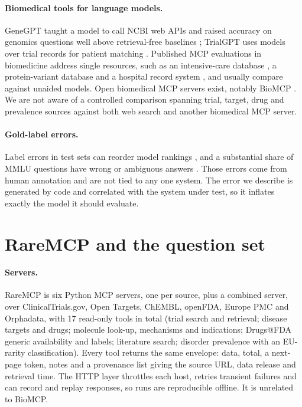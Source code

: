 \documentclass[11pt]{article}
\begin{document}
\paragraph{Biomedical tools for language models.} GeneGPT taught a model to call NCBI web APIs and raised accuracy on genomics questions well above retrieval-free baselines \citep{genegpt}; TrialGPT uses models over trial records for patient matching \citep{trialgpt}. Published MCP evaluations in biomedicine address single resources, such as an intensive-care database \citep{m3}, a protein-variant database \citep{disphasedb} and a hospital record system \citep{ehrmcp}, and usually compare against unaided models. Open biomedical MCP servers exist, notably BioMCP \citep{biomcp}. We are not aware of a controlled comparison spanning trial, target, drug and prevalence sources against both web search and another biomedical MCP server.

\paragraph{Gold-label errors.} Label errors in test sets can reorder model rankings \citep{northcutt2021}, and a substantial share of MMLU questions have wrong or ambiguous answers \citep{gema2025}. Those errors come from human annotation and are not tied to any one system. The error we describe is generated by code and correlated with the system under test, so it inflates exactly the model it should evaluate.

\section{RareMCP and the question set}
\label{sec:resource}

\paragraph{Servers.} RareMCP is six Python MCP servers, one per source, plus a combined server, over ClinicalTrials.gov, Open Targets, ChEMBL, openFDA, Europe PMC \citep{europepmc} and Orphadata, with 17 read-only tools in total (trial search and retrieval; disease targets and drugs; molecule look-up, mechanisms and indications; Drugs@FDA generic availability and labels; literature search; disorder prevalence with an EU-rarity classification). Every tool returns the same envelope: data, total, a next-page token, notes and a provenance list giving the source URL, data release and retrieval time. The HTTP layer throttles each host, retries transient failures and can record and replay responses, so runs are reproducible offline. It is unrelated to BioMCP.
\end{document}
